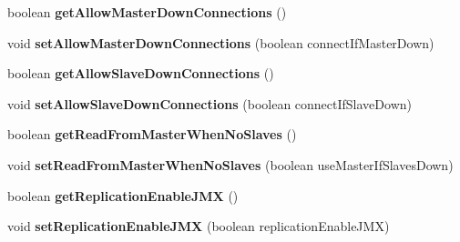 \begin{DoxyCompactItemize}
boolean {\bfseries get\+Allow\+Master\+Down\+Connections} ()
\item 
\mbox{\label{interfacecom_1_1mysql_1_1jdbc_1_1_connection_properties_a1bfb22ab4f077bce85420752ea7ecd49}} 
void {\bfseries set\+Allow\+Master\+Down\+Connections} (boolean connect\+If\+Master\+Down)
\item 
\mbox{\label{interfacecom_1_1mysql_1_1jdbc_1_1_connection_properties_abbb1624a77dda93379011106a2bc53a3}} 
boolean {\bfseries get\+Allow\+Slave\+Down\+Connections} ()
\item 
\mbox{\label{interfacecom_1_1mysql_1_1jdbc_1_1_connection_properties_a92893bec375bc8d236fcfbf60ec5341f}} 
void {\bfseries set\+Allow\+Slave\+Down\+Connections} (boolean connect\+If\+Slave\+Down)
\item 
\mbox{\label{interfacecom_1_1mysql_1_1jdbc_1_1_connection_properties_af38164371b7d75080b0e3338e8269029}} 
boolean {\bfseries get\+Read\+From\+Master\+When\+No\+Slaves} ()
\item 
\mbox{\label{interfacecom_1_1mysql_1_1jdbc_1_1_connection_properties_aa86381b3db0537a96557448fcf6067af}} 
void {\bfseries set\+Read\+From\+Master\+When\+No\+Slaves} (boolean use\+Master\+If\+Slaves\+Down)
\item 
\mbox{\label{interfacecom_1_1mysql_1_1jdbc_1_1_connection_properties_a63107c7ca40dca089d29b259bfa547f3}} 
boolean {\bfseries get\+Replication\+Enable\+J\+MX} ()
\item 
\mbox{\label{interfacecom_1_1mysql_1_1jdbc_1_1_connection_properties_a0e78edb67cc2859c61203e41d1861d7b}} 
void {\bfseries set\+Replication\+Enable\+J\+MX} (boolean replication\+Enable\+J\+MX)
\item 
\mbox{\label{interfacecom_1_1mysql_1_1jdbc_1_1_connection_properties_a208322529a7160f2031f1a4b7344a798}} 

\end{DoxyCompactItemize}
